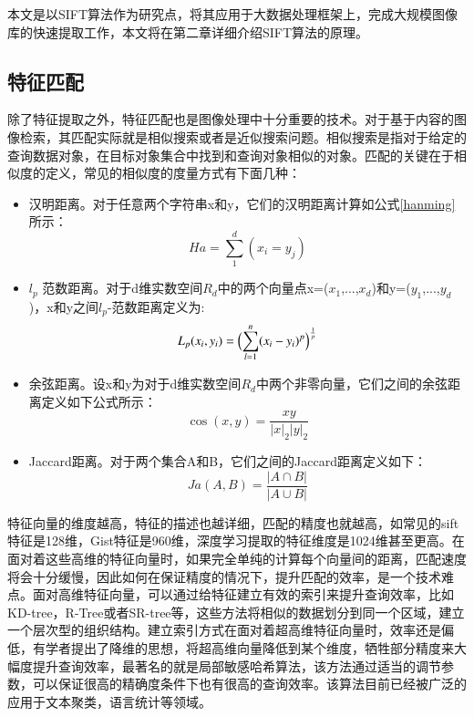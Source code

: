本文是以SIFT算法作为研究点，将其应用于大数据处理框架上，完成大规模图像库的快速提取工作，本文将在第二章详细介绍SIFT算法的原理。

\subsection{特征匹配}
除了特征提取之外，特征匹配也是图像处理中十分重要的技术。对于基于内容的图像检索，其匹配实际就是相似搜索或者是近似搜索问题。相似搜索是指对于给定的查询数据对象，在目标对象集合中找到和查询对象相似的对象。匹配的关键在于相似度的定义，常见的相似度的度量方式有下面几种：
\begin{itemize}
\item 汉明距离。对于任意两个字符串x和y，它们的汉明距离计算如公式\ref{hanming}所示：
\begin{equation}\label{hanming}
Ha=\sum_{1}^d(x_i=y_j)
\end{equation}

\item $l_p$ 范数距离。对于d维实数空间$R_d$中的两个向量点x=($x_1$,...,$x_d$)和y=($y_1$,...,$y_d$)，x和y之间$l_p$-范数距离定义为:
\begin{equation}\label{fanshu}
L_p(x_i,y_i)=\Bigl(\sum_{l=1}^n(x_i-y_i)^p\Bigr)^\frac{1}{p}
\end{equation}

\item 余弦距离。设x和y为对于d维实数空间$R_d$中两个非零向量，它们之间的余弦距离定义如下公式所示：
\begin{equation}\label{yuxian}
\cos(x,y)=\frac{xy}{|x|_2|y|_2}
\end{equation}

\item Jaccard距离。对于两个集合A和B，它们之间的Jaccard距离定义如下：
\begin{equation}\label{Jaccard}
Ja(A,B)=\frac{|{A}\cap{B}|}{|{A}\cup{B}|}
\end{equation}
\end{itemize}

特征向量的维度越高，特征的描述也越详细，匹配的精度也就越高，如常见的sift特征是128维，Gist特征是960维，深度学习提取的特征维度是1024维甚至更高。在面对着这些高维的特征向量时，如果完全单纯的计算每个向量间的距离，匹配速度将会十分缓慢，因此如何在保证精度的情况下，提升匹配的效率，是一个技术难点。面对高维特征向量，可以通过给特征建立有效的索引来提升查询效率，比如KD-tree，R-Tree或者SR-tree等，这些方法将相似的数据划分到同一个区域，建立一个层次型的组织结构。建立索引方式在面对着超高维特征向量时，效率还是偏低，有学者提出了降维的思想，将超高维向量降低到某个维度，牺牲部分精度来大幅度提升查询效率，最著名的就是局部敏感哈希算法，该方法通过适当的调节参数，可以保证很高的精确度条件下也有很高的查询效率。该算法目前已经被广泛的应用于文本聚类，语言统计等领域。

